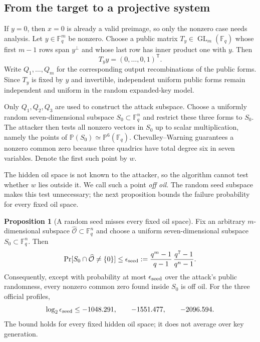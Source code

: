 \documentclass[11pt,a4paper]{article}
\theoremstyle{definition}
\newtheorem{proposition}[theorem]{Proposition}
\theoremstyle{remark}
\newcommand{\F}{\mathbb F}
\newcommand{\PP}{\mathbb P}
\newcommand{\cO}{\mathcal O}
\begin{document}
\subsection{From the target to a projective system}

If $y=0$, then $x=0$ is already a valid preimage, so only the nonzero case
needs analysis.  Let $y\in\F_q^m$ be nonzero.  Choose a public matrix
$T_y\in\operatorname{GL}_m(\F_q)$ whose first $m-1$ rows span $y^\perp$ and
whose last row has inner product one with $y$.  Then
\begin{equation}\label{eq:target-normalization}
 T_yy=(0,\ldots,0,1)^{\mathsf T}.
\end{equation}
Write $Q_1,\ldots,Q_m$ for the corresponding output recombinations of the
public forms.  Since $T_y$ is fixed by $y$ and invertible, independent uniform
public forms remain independent and uniform in the random expanded-key model.

Only $Q_1,Q_2,Q_3$ are used to construct the attack subspace.  Choose a
uniformly random seven-dimensional subspace $S_0\subset\F_q^n$ and restrict
these three forms to $S_0$.  The attacker then tests all nonzero vectors in
$S_0$ up to scalar multiplication, namely the points of
$\PP(S_0)\simeq\PP^6(\F_q)$.  Chevalley--Warning guarantees a nonzero common
zero because three quadrics have total degree six in seven variables.  Denote
the first such point by $w$.

The hidden oil space is not known to the attacker, so the algorithm cannot
test whether $w$ lies outside it.  We call such a point \emph{off oil}.  The
random seed subspace makes this test unnecessary; the next proposition bounds
the failure probability for every fixed oil space.

\begin{proposition}[A random seed misses every fixed oil space]\label{prop:off-oil-seed}
Fix an arbitrary $m$-dimensional subspace $\widehat{\cO}\subset\F_q^n$ and
choose a uniform seven-dimensional subspace $S_0\subset\F_q^n$.  Then
\begin{equation}\label{eq:seed-oil-bound}
 \Pr[S_0\cap\widehat{\cO}\ne\{0\}]
 \le
 \epsilon_{\rm seed}
 :=\frac{q^m-1}{q-1}\,
   \frac{q^7-1}{q^n-1}.
\end{equation}
Consequently, except with probability at most $\epsilon_{\rm seed}$ over
the attack's public randomness, every nonzero common zero found inside $S_0$ is off oil.
For the three official profiles,
\begin{equation}\label{eq:seed-oil-numbers}
 \log_2\epsilon_{\rm seed}
 \le -1048.291,\qquad-1551.477,\qquad-2096.594.
\end{equation}
The bound holds for every fixed hidden oil space; it does not average over key
generation.
\end{proposition}
\end{document}
